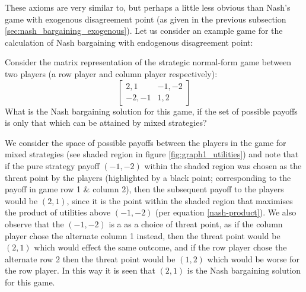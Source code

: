 These axioms are very similar to, but perhaps a little less obvious than Nash's game with exogenous disagreement point (as given in the previous subsection \ref{sec:nash_bargaining_exogenous}).
Let us consider an example game for the calculation of Nash bargaining with endogenous disagreement point:

\begin{example}
Consider the matrix representation of the strategic normal-form game between two players (a row player and column player respectively):
\begin{equation}\label{eq:example_game1} \begin{bmatrix}2,1 & -1,-2\\ -2,-1 & 1,2\end{bmatrix} \end{equation}
What is the Nash bargaining solution for this game, if the set of possible payoffs is only that which can be attained by mixed strategies?\end{example}
\begin{solution}
We consider the space of possible payoffs between the players in the game for mixed strategies (see shaded region in figure \ref{fig:graph1_utilities})
and note that if the pure strategy payoff $(-1,-2)$ within the shaded region was chosen as the threat point by the players (highlighted by a black point; corresponding to the payoff in game row 1 \& column 2), then the subsequent payoff to the players would be $(2,1)$, since it is the point within the shaded region that maximises the product of utilities above $(-1,-2)$ (per equation \ref{nash-product}).
We also observe that the $(-1,-2)$ is a \DIFdelbegin {}\DIFdelend \DIFaddbegin {}\DIFaddend as a choice of threat point, as if the column player chose the alternate column 1 instead, then the threat point would be $(2,1)$ which would effect the same outcome, and if the row player chose the alternate row 2 then the threat point would be $(1,2)$ which would be worse for the row player.
In this way it is seen that $(2,1)$ is the Nash bargaining solution for this game.
\end{solution}
\vspace{2mm}

